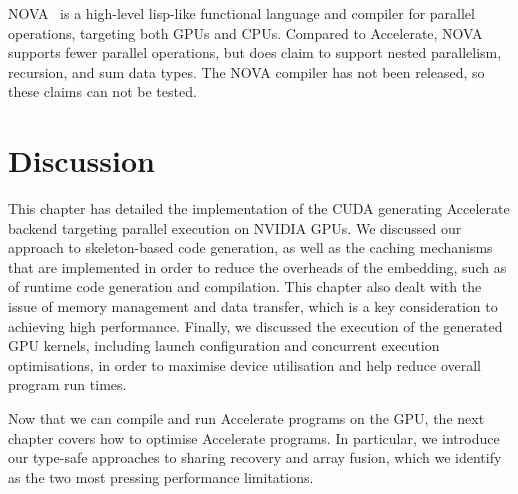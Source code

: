 NOVA~\cite{Collins:2013wn} is a high-level lisp-like functional language and
compiler for parallel operations, targeting both GPUs and CPUs. Compared to
Accelerate, NOVA supports fewer parallel operations, but does claim to support
nested parallelism, recursion, and sum data types. The NOVA compiler has not
been released, so these claims can not be tested.


\section{Discussion}

This chapter has detailed the implementation of the CUDA generating Accelerate
backend targeting parallel execution on NVIDIA GPUs. We discussed our approach
to skeleton-based code generation, as well as the caching mechanisms that are
implemented in order to reduce the overheads of the embedding, such as of
runtime code generation and compilation. This chapter also dealt with the issue
of memory management and data transfer, which is a key consideration to
achieving high performance. Finally, we discussed the execution of the generated
GPU kernels, including launch configuration and concurrent execution
optimisations, in order to maximise device utilisation and help reduce overall
program run times.

Now that we can compile and run Accelerate programs on the GPU, the next chapter
covers how to optimise Accelerate programs. In particular, we introduce our
type-safe approaches to sharing recovery and array fusion, which we identify as
the two most pressing performance limitations.


% 



